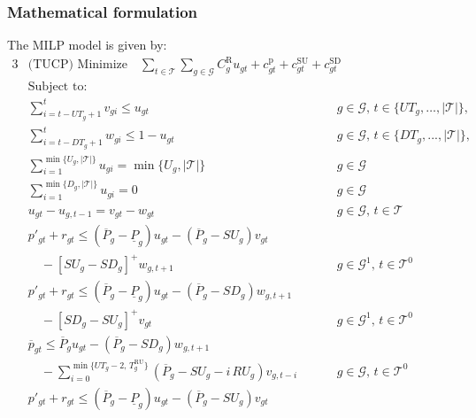 \subsubsection*{Mathematical formulation}
The MILP model is given by:
\begin{alignat}{3}
& \text{(TUCP) Minimize}\quad \sum\limits_{t\in\mathcal{T}} \sum\limits_{g\in \mathcal{G}} C_{g}^{\text{R}}u_{gt} + c_{gt}^{\text{p}} +  c_{gt}^{\text{SU}} + c_{gt}^{\text{SD}} \qquad &&  \label{eq:obj}
\\
& \text{Subject to: }  && \nonumber \\
&\sum_{i=t-UT_{g}+1}^{t} v_{gi} \leq  u_{gt}
&&  g\in\mathcal{G}, \, t\in \{ UT_g, \ldots, |\mathcal{T}| \},  \label{MUT}\\
%
& \sum_{i=t-DT_{g}+1}^{t} w_{gi}\leq 1-u_{gt}
&& g\in\mathcal{G}, \, t\in \{ DT_{g},...,|\mathcal{T}| \}, \label{MDT}\\
%
& \sum_{i=1}^{\min\{ U_{g},|\mathcal{T}| \}} u_{gi} = \min \{ U_{g},|\mathcal{T}| \}
&&  g\in\mathcal{G} \label{MUT2}\\
%
& \sum_{i=1}^{\min\{ D_{g},|\mathcal{T}| \}} u_{gi} = 0
&& g\in\mathcal{G} \label{MDT2}\\
%
& u_{gt}-u_{g,t-1} = v_{gt}-w_{gt}
&& g\in\mathcal{G}, \, t\in\mathcal{T} \label{garver}\\
%
& p'_{gt}+r_{gt}\leq \left( \overline{P}_{g} - \underline{P}_{g} \right)u_{gt} - \left( \overline{P}_{g}-\textit{SU}_{g} \right) v_{gt} && \nonumber\\ 
& \quad -\left[ \textit{SU}_{g} - SD_{g} \right]^{+} w_{g,t+1} && g\in\mathcal{G}^{1}, \, t\in \mathcal{T}^0\label{genlim1}\\
%
& p'_{gt}+r_{gt}\leq \left( \overline{P}_{g} - \underline{P}_{g} \right)u_{gt} - \left( \overline{P}_{g}-\textit{SD}_{g} \right) w_{g,t+1} && \nonumber\\
& \quad -\left[ \textit{SD}_{g} - \textit{SU}_{g} \right]^{+} v_{gt}
&& g\in \mathcal{G}^{1}, \, t \in \mathcal{T}^0 \label{genlim2}\\
%
& \overline{p}_{gt} \leq \overline{P}_{g}u_{gt} - \left(  \overline{P}_{g}-\textit{SD}_{g} \right) w_{g,t+1} && \nonumber\\ 
& \quad - \sum_{i=0}^{\min\{ \textit{UT}_g-2, \, T^{\text{RU}}_g \}} \left(  \overline{P}_{g} -\textit{SU}_g-i\,\textit{RU}_g\right)v_{g,t-i}
&& g\in\mathcal{G}, \, t\in \mathcal{T}^0 \label{genlim3}\\
%
& p'_{gt}+r_{gt}\leq \left( \overline{P}_{g} - \underline{P}_{g} \right) u_{gt} - \left( \overline{P}_{g}-\textit{SU}_{g} \right) v_{gt} && \nonumber\\ 

\end{alignat}

